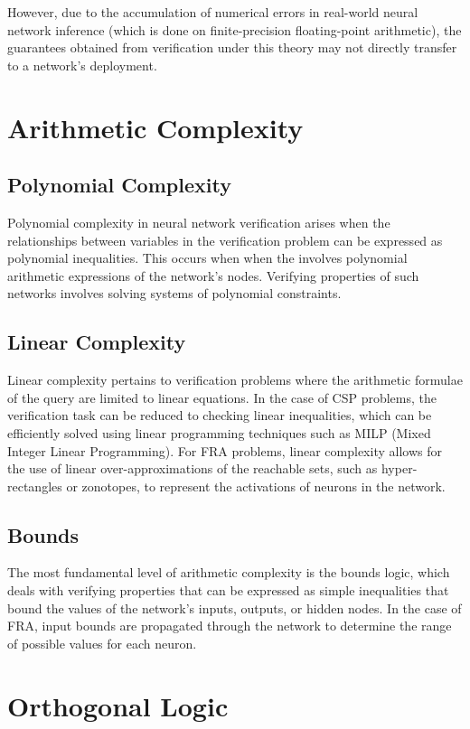 However, due to the accumulation of numerical errors in real-world neural network inference (which is done on finite-precision floating-point arithmetic), 
the guarantees obtained from verification under this theory may not directly transfer to a network's deployment. 

\section{Arithmetic Complexity}

\subsection*{Polynomial Complexity}
Polynomial complexity in neural network verification arises when the relationships between variables in the verification problem can be expressed as polynomial inequalities. 
This occurs when when the \vnnlib{} involves polynomial arithmetic expressions of the network's nodes. Verifying properties of such networks involves solving systems of polynomial constraints.

\subsection*{Linear Complexity}
Linear complexity pertains to verification problems where the arithmetic formulae of the query are limited to linear equations. In the case of CSP problems, the verification task can be reduced 
to checking linear inequalities, which can be efficiently solved using linear programming techniques such as MILP (Mixed Integer Linear Programming). For FRA problems, linear complexity allows 
for the use of linear over-approximations of the reachable sets, such as hyper-rectangles or zonotopes, to represent the activations of neurons in the network.

\subsection*{Bounds}
The most fundamental level of arithmetic complexity is the bounds logic, which deals with verifying properties that can be expressed as simple inequalities that bound the values of the network's 
inputs, outputs, or hidden nodes. In the case of FRA, input bounds are propagated through the network to determine the range of possible values for each neuron.

\section{Orthogonal Logic}


